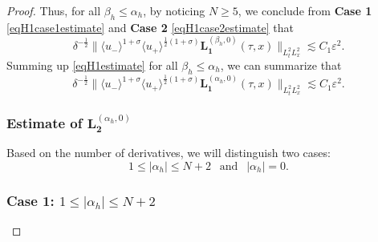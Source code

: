 \documentclass[10pt,reqno]{amsart}
\numberwithin{equation}{section}
\begin{document}
\begin{proof}
	Thus, for all $\beta_h\leqslant\alpha_h$, by noticing $N\geqslant 5$, we conclude from \textbf{Case 1} \eqref{eqH1case1estimate} and \textbf{Case 2} \eqref{eqH1case2estimate} that 
	\begin{equation}\label{eqH1estimate}
		\delta^{-\frac{1}{2}}\big\|\langle u_-\rangle^{1+\sigma}\langle u_+\rangle^{\frac{1}{2}(1+\sigma)}\mathbf{L}_{\mathbf{1}}^{(\beta_h,0)}(\tau,x)\big\|_{L^2_tL^2_x} 
		\lesssim C_1\varepsilon^2.
	\end{equation}
	Summing up \eqref{eqH1estimate} for all $\beta_h\leqslant\alpha_h$, we can summarize that 
	\begin{equation}\label{eqH1estimate-total}
		\delta^{-\frac{1}{2}}\big\|\langle u_-\rangle^{1+\sigma}\langle u_+\rangle^{\frac{1}{2}(1+\sigma)}\mathbf{L}_{\mathbf{1}}^{(\alpha_h,0)}(\tau,x)\big\|_{L^2_tL^2_x} 
		\lesssim C_1\varepsilon^2.
	\end{equation}
	
	\subsubsection*{\bf Estimate of $\mathbf{L}_{\mathbf{2}}^{(\alpha_h,0)}$}
	Based on the number of derivatives, we will distinguish two cases: 
	\[1\leqslant|\alpha_h|\leqslant N+2\ \ \text{ and }\ \ |\alpha_h|=0.\]
	
	\subsubsection*{\bf Case 1:  $1\leqslant |\alpha_h|\leqslant N+2$}
	

\end{proof}
\end{document}

